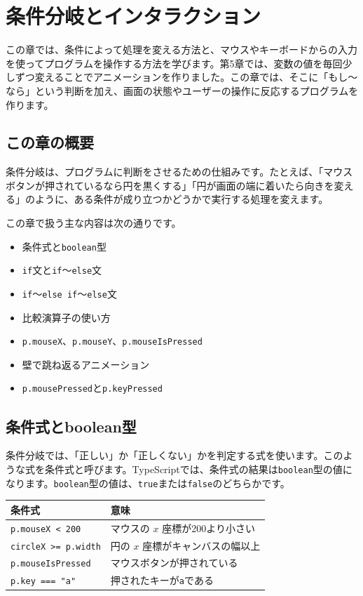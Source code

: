 \chapter{条件分岐とインタラクション}
\label{chap:conditions-and-interaction}

この章では、条件によって処理を変える方法と、マウスやキーボードからの入力を使ってプログラムを操作する方法を学びます。第5章では、変数の値を毎回少しずつ変えることでアニメーションを作りました。この章では、そこに「もし〜なら」という判断を加え、画面の状態やユーザーの操作に反応するプログラムを作ります。

\section{この章の概要}

条件分岐は、プログラムに判断をさせるための仕組みです。たとえば、「マウスボタンが押されているなら円を黒くする」「円が画面の端に着いたら向きを変える」のように、ある条件が成り立つかどうかで実行する処理を変えます。

この章で扱う主な内容は次の通りです。

\begin{itemize}
    \item 条件式と\texttt{boolean}型
    \item \texttt{if}文と\texttt{if}〜\texttt{else}文
    \item \texttt{if}〜\texttt{else if}〜\texttt{else}文
    \item 比較演算子の使い方
    \item \texttt{p.mouseX}、\texttt{p.mouseY}、\texttt{p.mouseIsPressed}
    \item 壁で跳ね返るアニメーション
    \item \texttt{p.mousePressed}と\texttt{p.keyPressed}
\end{itemize}

\section{条件式とboolean型}

条件分岐では、「正しい」か「正しくない」かを判定する式を使います。このような式を条件式と呼びます。TypeScriptでは、条件式の結果は\texttt{boolean}型の値になります。\texttt{boolean}型の値は、\texttt{true}または\texttt{false}のどちらかです。

\begin{center}
\begin{tabular}{ll}
\toprule
条件式 & 意味 \\
\midrule
\texttt{p.mouseX < 200} & マウスの $x$ 座標が200より小さい \\
\texttt{circleX >= p.width} & 円の $x$ 座標がキャンバスの幅以上 \\
\texttt{p.mouseIsPressed} & マウスボタンが押されている \\
\texttt{p.key === "a"} & 押されたキーが\texttt{a}である \\
\bottomrule
\end{tabular}
\end{center}


